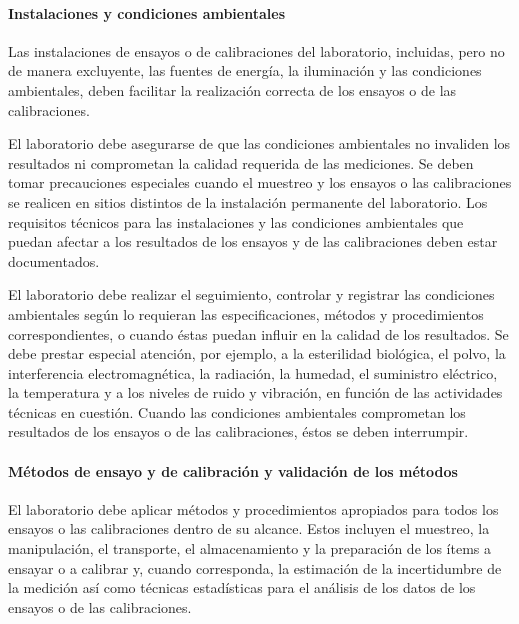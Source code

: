 \newpage
\thispagestyle{plain}

		\paragraph{Instalaciones y condiciones ambientales}
			\par 
				Las instalaciones de ensayos o de calibraciones del laboratorio, incluidas, pero no de manera
				excluyente, las fuentes de energía, la iluminación y las condiciones ambientales, deben facilitar la realización
				correcta de los ensayos o de las calibraciones.
			
			\par \noindent
				El laboratorio debe asegurarse de que las condiciones ambientales no invaliden los resultados ni
				comprometan la calidad requerida de las mediciones. Se deben tomar precauciones especiales cuando el
				muestreo y los ensayos o las calibraciones se realicen en sitios distintos de la instalación permanente del
				laboratorio. Los requisitos técnicos para las instalaciones y las condiciones ambientales que puedan afectar a
				los resultados de los ensayos y de las calibraciones deben estar documentados.
				
			\par \noindent
				El laboratorio debe realizar el seguimiento, controlar y registrar las condiciones ambientales según lo
				requieran las especificaciones, métodos y procedimientos correspondientes, o cuando éstas puedan influir en
				la calidad de los resultados. Se debe prestar especial atención, por ejemplo, a la esterilidad biológica, el polvo,
				la interferencia electromagnética, la radiación, la humedad, el suministro eléctrico, la temperatura y a los
				niveles de ruido y vibración, en función de las actividades técnicas en cuestión. Cuando las condiciones
				ambientales comprometan los resultados de los ensayos o de las calibraciones, éstos se deben interrumpir.
				
		\paragraph{Métodos de ensayo y de calibración y validación de los métodos}
			\par 
				El laboratorio debe aplicar métodos y procedimientos apropiados para todos los ensayos o las calibraciones
				dentro de su alcance. Estos incluyen el muestreo, la manipulación, el transporte, el almacenamiento y la
				preparación de los ítems a ensayar o a calibrar y, cuando corresponda, la estimación de la incertidumbre de
				la medición así como técnicas estadísticas para el análisis de los datos de los ensayos o de las calibraciones.
				

